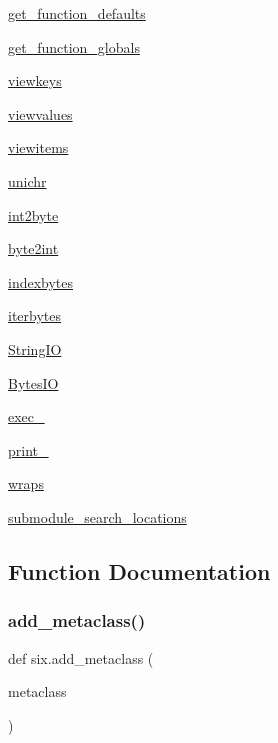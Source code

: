 \begin{DoxyCompactItemize}
\item 
\hyperlink{namespacesix_ad0b187b39865ce712b907f81e1f0d744}{get\+\_\+function\+\_\+defaults}
\item 
\hyperlink{namespacesix_acccb7a0407196b6b1fe0ce76ba93d7a7}{get\+\_\+function\+\_\+globals}
\item 
\hyperlink{namespacesix_ad2206e5e921294fa8eb626bc615e0395}{viewkeys}
\item 
\hyperlink{namespacesix_a71eb4fded7f75b30633e42a157585284}{viewvalues}
\item 
\hyperlink{namespacesix_abb1f58c1fd2e77496261e70f4ce871d6}{viewitems}
\item 
\hyperlink{namespacesix_a32dbc25df1cde32d5c59d7cbfa63ddc1}{unichr}
\item 
\hyperlink{namespacesix_a84f0a486bede297c97d3534c8592673f}{int2byte}
\item 
\hyperlink{namespacesix_a34d8d61488b379c61fb59c77498ce964}{byte2int}
\item 
\hyperlink{namespacesix_a3e356fc8418cb6c1df6fe533ed89c10b}{indexbytes}
\item 
\hyperlink{namespacesix_a9d56337c7613cdf4505f4bf4e99a52e1}{iterbytes}
\item 
\hyperlink{namespacesix_a1875e440165f8faa30af1c2de2215ae8}{String\+IO}
\item 
\hyperlink{namespacesix_afa02f81e3e5ce3921aeb6dc286912fac}{Bytes\+IO}
\item 
\hyperlink{namespacesix_a1c4aa7a48cca4717210b1cdd75680a50}{exec\+\_\+}
\item 
\hyperlink{namespacesix_aa26b05c4e07d049588324108a8a1cdd8}{print\+\_\+}
\item 
\hyperlink{namespacesix_a39b5267223b387d63a745c96650cf61b}{wraps}
\item 
\hyperlink{namespacesix_a37c02ba6442235417d3f2b668ba7a4b3}{submodule\+\_\+search\+\_\+locations}
\end{DoxyCompactItemize}


\subsection{Function Documentation}
\mbox{\label{namespacesix_ac92c20d6dc6979883b76fc6cf43f44b8}} 
\subsubsection{\texorpdfstring{add\+\_\+metaclass()}{add\_metaclass()}}
{\footnotesize\ttfamily def six.\+add\+\_\+metaclass (\begin{DoxyParamCaption}\item[{}]{metaclass }\end{DoxyParamCaption})}

